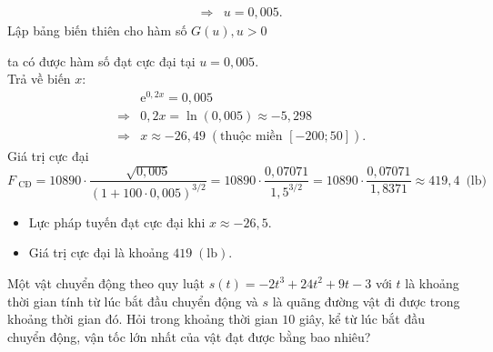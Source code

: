 \begin{bt}
{\begin{eqnarray*}
			&\Rightarrow& u=0{,}005. 
		\end{eqnarray*}
		Lập bảng biến thiên cho  hàm số $G(u), u > 0$
		\begin{center}
		\end{center}
		ta có được hàm số đạt cực  đại tại $u=0,005$.\\
		 Trả về biến $x$: \allowdisplaybreaks
		\begin{eqnarray*}
			 &&\mathrm{e}^{0,2x}=0{,}005\\
			&\Rightarrow& 0{,}2x=\ln(0{,}005)  \approx-5{,}298\\
			&\Rightarrow&  x \approx-26{,}49\;\left(\text{thuộc miền }[-200;50]\right).
		\end{eqnarray*}
		Giá trị cực đại $F_{\text{ CĐ}}=10890\cdot\dfrac{\sqrt{0{,}005}}{(1+100\cdot 0{,}005)^{3/2}}=10890\cdot\dfrac{0{,}07071}{1{,}5^{3/2}}=10890\cdot\dfrac{0{,}07071}{1{,}8371} \approx 419{,}4\,\text{  (lb)}$
		\begin{itemize}
			\item Lực pháp tuyến đạt cực đại khi $x \approx-26{,}5$. 
			\item Giá trị cực đại là khoảng $419\;(\mathrm{lb})$. 
		\end{itemize}
	} 
\end{bt}

\begin{bt}%
	Một vật chuyển động theo quy luật $s(t)=-2t^3+24t^2+9t-3$ với $t$ là khoảng thời gian tính từ lúc bắt đầu chuyển động và $s$ là quãng đường vật đi được trong khoảng thời gian đó. Hỏi trong khoảng  thời gian $10$ giây, kể từ lúc bắt đầu chuyển động, vận tốc lớn nhất của vật đạt được bằng bao nhiêu?
\end{bt}

